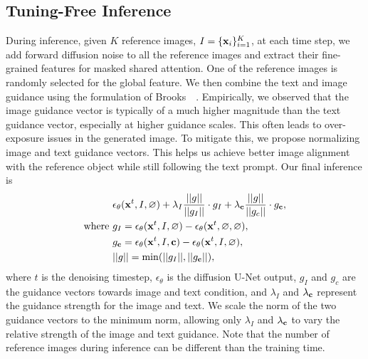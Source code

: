 \subsection{Tuning-Free Inference}
\label{sec:tuning_free_inference}
During inference, given $K$ reference images, $I=\{{\mathbf{x}}_i \}_{i=1}^K$, at each time step, we add forward diffusion noise to all the reference images and extract their fine-grained features for masked shared attention. One of the reference images is randomly selected for the global feature. We then combine the text and image guidance using the formulation of Brooks~\etal ~\cite{brooks2023instructpix2pix}. Empirically, we observed that the image guidance vector is typically of a much higher magnitude than the text guidance vector, especially at higher guidance scales. This often leads to over-exposure issues in the generated image. To mitigate this, we propose normalizing image and text guidance vectors. This helps us achieve better image alignment with the reference object while still following the text prompt. Our final inference is
\begin{equation}
    \begin{aligned}
    & \epsilon_{\theta}(\x^t, I, \varnothing) + \lambda_{I}\frac{||g||}{||g_{I}||} \cdot g_{I}  + \lambda_{\c}\frac{||g||}{||g_{c}||} \cdot g_{\c}, \\
 \text{where } & g_{I} = \epsilon_{\theta}(\x^t, I, \varnothing)  - \epsilon_{\theta}(\x^t, \varnothing, \varnothing), \\
   & g_{\c} = \epsilon_{\theta}(\x^t, I, \mathbf{c})  - \epsilon_{\theta}(\x^t, I, \varnothing), \\
   & ||g|| = \min (||g_I||, ||g_{\c}||),
    \end{aligned}\lbleq{inference}
\end{equation}
where $t$ is the denoising timestep, $\epsilon_{\theta}$ is the diffusion U-Net output, $g_{I}$ and $g_{c}$ are the guidance vectors towards image and text condition, and $\lambda_{I}$ and $\lambda_{{\mathbf{c}}}$ represent the guidance strength for the image and text. We scale the norm of the two guidance vectors to the minimum norm, allowing only $\lambda_{I}$ and $\lambda_{{\mathbf{c}}}$ to vary the relative strength of the image and text guidance. Note that the number of reference images during inference can be different than the training time.





